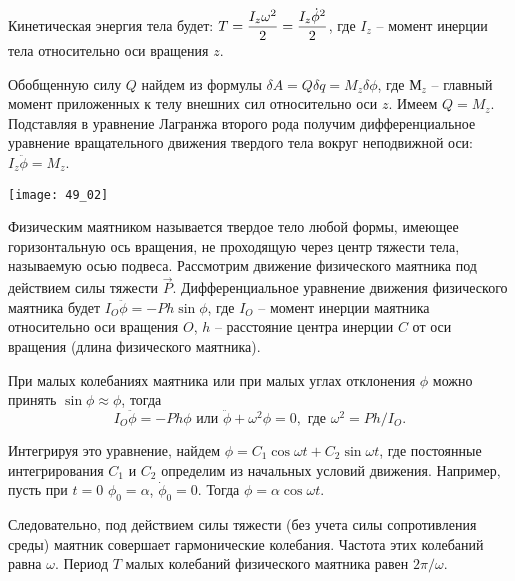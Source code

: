 Кинетическая энергия тела будет:
\( \displaystyle T = \frac{I_z\omega^2}{2} = \frac{I_z\dot{\phi}^2}{2} \), 
где \( I_z \) -- момент инерции тела относительно оси вращения \( z \).

Обобщенную силу \( Q \) найдем из формулы
\( \delta A = Q\delta q = M_z\delta\phi \), где \( М_z \) -- главный момент
приложенных к телу внешних сил относительно оси \( z \). Имеем \( Q = M_z \).
Подставляя в уравнение Лагранжа второго рода получим дифференциальное уравнение
вращательного движения твердого тела вокруг неподвижной оси:
\( I_z\ddot{\phi} = M_z \).

\begin{minipage}{.35\textwidth}
    \texttt{[image: 49\_02]}
\end{minipage}
\begin{minipage}{.6\textwidth}
Физическим маятником называется твердое тело любой формы, имеющее горизонтальную
ось вращения, не проходящую через центр тяжести тела, называемую осью подвеса.
Рассмотрим движение физического маятника под действием силы тяжести
\( \vec{P} \). Дифференциальное уравнение движения физического маятника будет
\( I_O\ddot{\phi} = -Ph\sin\phi \), где \( I_O \) -- момент инерции маятника
относительно оси вращения \( O \), \( h \) -- расстояние центра инерции \( C \)
от оси вращения (длина физического маятника).
\end{minipage}

При малых колебаниях маятника или при малых углах отклонения \( \phi \) можно
принять \( \sin\phi \approx \phi \), тогда
\[
    I_O\ddot{\phi} = -Ph\phi \text{ или } \ddot{\phi} + \omega^2\phi = 0,
    \text{ где } \omega^2 = Ph/I_O.
\]

Интегрируя это уравнение, найдем \( \phi = C_1\cos\omega t + C_2\sin\omega t \),
где постоянные интегрирования \( C_1 \) и \( C_2 \) определим из начальных
условий движения. Например, пусть при \( t = 0 \) \( \phi_0 = \alpha \),
\( \dot{\phi}_0 = 0 \). Тогда \( \phi =\alpha\cos\omega t \).

Следовательно, под действием силы тяжести (без учета силы сопротивления среды)
маятник совершает гармонические колебания. Частота этих колебаний равна
\( \omega \). Период \( T \) малых колебаний физического маятника равен
\( 2\pi/\omega \).

\newpage
